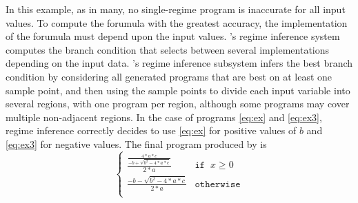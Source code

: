 \documentclass[paper.tex]{subfiles}
\begin{document}
In this example, as in many,
  no single-regime program is inaccurate for all input values.
To compute the forumula with the greatest accuracy,
  the implementation of the forumula must depend upon the input values.
\casio's regime inference system
  computes the branch condition
  that selects between several implementations depending on the input data.
\casio's regime inference subsystem
  infers the best branch condition
  by considering all generated programs
  that are best on at least one sample point,
  and then using the sample points to divide each input variable
  into several regions, with one program per region,
  although some programs may cover multiple non-adjacent regions.
In the case of programs \eqref{eq:ex} and \eqref{eq:ex3},
  regime inference correctly decides
  to use \eqref{eq:ex} for positive values of $b$
  and \eqref{eq:ex3} for negative values.
The final program produced by \casio is
\[
\begin{cases}
  \frac{\frac{4*a*c}
             {-b + \sqrt{b^2 - 4*a*c}}}
       {2*a} & \mathtt{if} \;\; x \ge 0 \\[8pt]
  \frac{-b - \sqrt{b^2 - 4*a*c}}
       {2*a} & \mathtt{otherwise} \\
\end{cases}
\]
\end{document}
